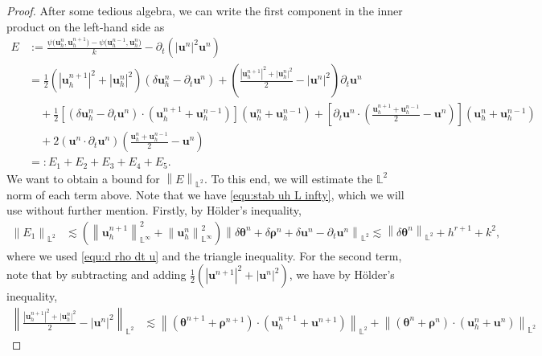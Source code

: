 \documentclass[11pt, reqno]{amsart}
\theoremstyle{definition}
\theoremstyle{remark}
\numberwithin{equation}{section}
\newcommand{\bff}{\boldsymbol}
\newcommand{\bb}{\mathbb}
\newcommand{\norm}[2]{\left\|{#1}\right\|_{#2}}
\newcommand{\abs}[1]{\left|{#1}\right|}
\begin{document}
\begin{proof}
After some tedious algebra, we can write the first component in the inner product on the left-hand side as
\begin{align*}
	E 
	&:= 
	\frac{\psi\big(\bff{u}_h^n,\bff{u}_h^{n+1}\big) - \psi\big(\bff{u}_h^{n-1}, \bff{u}_h^n\big)}{k} - \partial_t \left(\abs{\bff{u}^n}^2 \bff{u}^n\right)
	\\
	&=
	\frac{1}{2} \left(\abs{\bff{u}_h^{n+1}}^2 + \abs{\bff{u}_h^n}^2 \right)  \left(\delta \bff{u}_h^n - \partial_t \bff{u}^n \right)
	+
	\left( \frac{\abs{\bff{u}_h^{n+1}}^2+\abs{\bff{u}_h^n}^2}{2} - \abs{\bff{u}^n}^2\right) \partial_t \bff{u}^n
	\\
	&\quad
	+
	\frac{1}{2} \left[\left(\delta \bff{u}_h^n- \partial_t \bff{u}^n\right)\cdot \left(\bff{u}_h^{n+1}+\bff{u}_h^{n-1}\right) \right] \left(\bff{u}_h^n+\bff{u}_h^{n-1}\right)
	+
	\left[\partial_t \bff{u}^n \cdot \left(\frac{\bff{u}_h^{n+1}+\bff{u}_h^{n-1}}{2}-\bff{u}^n\right)\right] \left(\bff{u}_h^n+\bff{u}_h^{n-1}\right)
	\\
	&\quad
	+
	2 \left(\bff{u}^n\cdot \partial_t \bff{u}^n\right) \left(\frac{\bff{u}_h^n+\bff{u}_h^{n-1}}{2}- \bff{u}^n\right)
	\\
	&=: E_1+E_2+E_3+E_4+E_5.
\end{align*}
We want to obtain a bound for $\norm{E}{\bb{L}^2}$. To this end, we will estimate the $\bb{L}^2$ norm of each term above. Note that we have \eqref{equ:stab uh L infty}, which we will use without further mention. Firstly, by H\"older's inequality,
\begin{align}\label{equ:L1}
	\norm{E_1}{\bb{L}^2}
	&\lesssim
	\left( \norm{\bff{u}_h^{n+1}}{\bb{L}^\infty}^2 + \norm{\bff{u}_h^n}{\bb{L}^\infty}^2 \right)
	\norm{\delta \bff{\theta}^n+\delta \bff{\rho}^n+\delta \bff{u}^n-\partial_t \bff{u}^n}{\bb{L}^2}
	\lesssim
	\norm{\delta \bff{\theta}^n}{\bb{L}^2} + h^{r+1} + k^2,
\end{align}
where we used \eqref{equ:d rho dt u} and the triangle inequality. For the second term, note that by subtracting and adding $\frac{1}{2} \left(\abs{\bff{u}^{n+1}}^2 + \abs{\bff{u}^n}^2\right)$, we have by H\"older's inequality,
\begin{align*}
	\norm{\frac{\abs{\bff{u}_h^{n+1}}^2+\abs{\bff{u}_h^n}^2}{2} - \abs{\bff{u}^n}^2}{\bb{L}^2} 
	&\lesssim
	\norm{\left(\bff{\theta}^{n+1}+\bff{\rho}^{n+1}\right) \cdot \left(\bff{u}_h^{n+1}+\bff{u}^{n+1}\right)}{\bb{L}^2}
	+
	\norm{\left(\bff{\theta}^n+\bff{\rho}^n\right) \cdot \left(\bff{u}_h^n+\bff{u}^n\right)}{\bb{L}^2}

\end{align*}
\end{proof}
\end{document}
